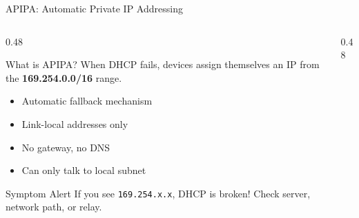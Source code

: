 \documentclass[aspectratio=169, 11pt]{beamer}
\newcommand{\iconpc}[1][0.6cm]{\resizebox{#1}{!}{\faDesktop}}
\newcommand{\keyterm}[1]{\textbf{\textcolor{rctcblue}{#1}}}
\begin{document}
\begin{frame}{APIPA: Automatic Private IP Addressing}
    \begin{columns}[T]
        \begin{column}{0.48\textwidth}
            \begin{block}{What is APIPA?}
                \small
                When DHCP fails, devices assign themselves an IP from the \keyterm{169.254.0.0/16} range.
                
                \vspace{0.2em}
                \begin{itemize}\setlength{\itemsep}{1pt}
                    \item Automatic fallback mechanism
                    \item Link-local addresses only
                    \item No gateway, no DNS
                    \item Can only talk to local subnet
                \end{itemize}
            \end{block}
            
            \vspace{0.2em}
            \begin{alertblock}{Symptom Alert}
                \small
                If you see \texttt{169.254.x.x}, DHCP is broken! Check server, network path, or relay.
            \end{alertblock}
        \end{column}
        \begin{column}{0.48\textwidth}
            \begin{center}
\end{center}
\end{column}
\end{columns}
\end{frame}
\end{document}
